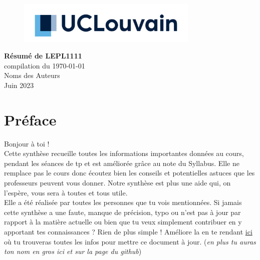 \documentclass{report}
\begin{document}
\begin{titlepage}
    \begin{figure}
        \includegraphics[height = 2cm]{UCL_Logo.png}
        \label{fig:my_label}
    \end{figure}

    \hspace*{100cm}
    \centering
    \vspace*{7cm}

    {\Huge \textbf{Résumé de LEPL1111}}\\
    \vspace*{0.25cm}
    compilation du \today\\
    \vspace*{0.25cm}
    \Large{Noms des Auteurs}\\

    \vspace*{9.5cm} %
    {\Large Juin 2023}
\end{titlepage}

\tableofcontents
\newpage

\section*{Préface}

Bonjour à toi !\\

Cette synthèse recueille toutes les informations importantes données au cours, pendant les séances de tp et est améliorée grâce au note du Syllabus. Elle ne remplace pas le cours donc écoutez bien les conseils et potentielles astuces que les professeurs peuvent vous donner. Notre synthèse est plus une aide qui, on l'espère, vous sera à toutes et tous utile.\\

Elle a été réalisée par toutes les personnes que tu vois mentionnées. Si jamais cette synthèse a une faute, manque de précision, typo ou n'est pas à jour par rapport à la matière actuelle ou bien que tu veux simplement contribuer en y apportant tes connaissances ? Rien de plus simple ! Améliore la en te rendant \href{http://www.github.com/Tfloow/Q4_EPL}{ici} où tu trouveras toutes les infos pour mettre ce document à jour. (\textit{en plus tu auras ton nom en gros ici et sur la page du github})\\
\end{document}
